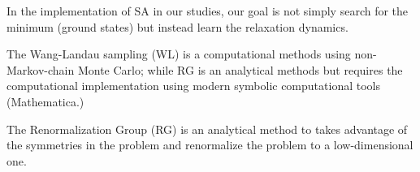 In the implementation of SA in our studies, our goal is not simply search for the minimum (ground states) but instead learn the relaxation  dynamics. 

The Wang-Landau sampling (WL) is a computational methods using non-Markov-chain Monte Carlo; while RG is an analytical methods but requires the computational implementation using modern symbolic computational tools (Mathematica.)


The Renormalization Group (RG) is an analytical method to takes advantage of the symmetries in the problem and renormalize the problem to a low-dimensional one.










